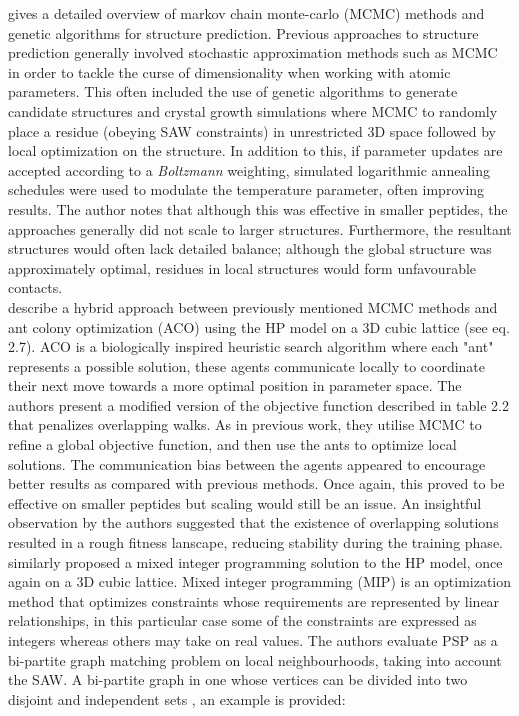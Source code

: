 \cite{Hansmann1999} gives a detailed overview of markov chain monte-carlo (MCMC) methods and genetic
algorithms for structure prediction. Previous approaches to structure prediction generally involved stochastic
approximation methods such as MCMC in order to tackle the curse of dimensionality when working
with atomic parameters. This often included the use of genetic algorithms
to generate candidate structures and crystal growth simulations where MCMC to randomly
place a residue (obeying SAW constraints) in unrestricted 3D space followed by local optimization
on the structure. In addition to this, if parameter updates are accepted according to a \emph{Boltzmann}
weighting, simulated logarithmic annealing schedules were used to modulate the temperature parameter, often improving results. 
The author notes that although this was effective in smaller peptides, the approaches generally
did not scale to larger structures. Furthermore, the resultant structures would often lack detailed balance;
although the global structure was approximately optimal, residues in local structures would form unfavourable
contacts. \\

\cite{Citrolo2013} describe a hybrid approach between previously mentioned MCMC methods and ant colony optimization (ACO)
using the HP model on a 3D cubic lattice (see eq. 2.7).
ACO is a biologically inspired heuristic search algorithm where each "ant" represents a possible solution, these
agents communicate locally to coordinate their next move towards a more optimal position in parameter space.
The authors present a modified version of the objective function described in table 2.2 that penalizes
overlapping walks. As in previous work, they utilise MCMC to refine a global objective function, and then
use the ants to optimize local solutions. The communication bias between the agents appeared to encourage
better results as compared with previous methods. Once again, this proved to be effective on smaller peptides
but scaling would still be an issue. An insightful observation by the authors suggested that the existence of overlapping
solutions resulted in a rough fitness lanscape, reducing stability during the training phase. \\

\cite{Yanev2017} similarly proposed a mixed integer programming solution to the HP model, once again
on a 3D cubic lattice. Mixed integer programming (MIP) is an optimization method that optimizes constraints
whose requirements are represented by linear relationships, in this particular case some of the constraints
are expressed as integers whereas others may take on real values. The authors evaluate PSP as a bi-partite
graph matching problem on local neighbourhoods, taking into account the SAW. A bi-partite graph in one whose
vertices can be divided into two disjoint and independent sets \cite{Handa1999BipartitieGW}, an example is
provided:

